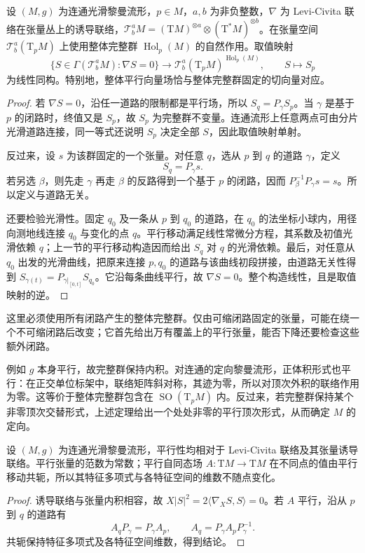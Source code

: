 \begin{theorem}\label{g3:thm:holonomy-parallel-tensors}
	设 \((M,g)\) 为连通光滑黎曼流形，\(p\in M\)，\(a,b\) 为非负整数，\(\nabla\) 为 Levi-Civita 联络在张量丛上的诱导联络，\(\mathcal T^a_bM=(\mathrm TM)^{\otimes a}\otimes(\mathrm T^*M)^{\otimes b}\)。在张量空间 \(\mathcal T^a_b(\mathrm{T}_pM)\) 上使用整体完整群 \(\operatorname{Hol}_p(M)\) 的自然作用。取值映射
	\[
		\{S\in\Gamma(\mathcal T^a_bM):\nabla S=0\}
		\longrightarrow
		\mathcal T^a_b(\mathrm{T}_pM)^{\operatorname{Hol}_p(M)},
		\qquad S\longmapsto S_p
	\]
	为线性同构。特别地，整体平行向量场恰与整体完整群固定的切向量对应。
\end{theorem}
\begin{proof}
	若 \(\nabla S=0\)，沿任一道路的限制都是平行场，所以
	\(S_q=P_\gamma S_p\)。当 \(\gamma\) 是基于 \(p\) 的闭路时，终值又是 \(S_p\)，故 \(S_p\) 为完整群不变量。连通流形上任意两点可由分片光滑道路连接，同一等式还说明 \(S_p\) 决定全部 \(S\)，因此取值映射单射。

	反过来，设 \(s\) 为该群固定的一个张量。对任意 \(q\)，选从 \(p\) 到 \(q\) 的道路 \(\gamma\)，定义
	\[
		S_q=P_\gamma s.
	\]
	若另选 \(\beta\)，则先走 \(\gamma\) 再走 \(\beta\) 的反路得到一个基于 \(p\) 的闭路，因而
	\(P_\beta^{-1}P_\gamma s=s\)。所以定义与道路无关。

	还要检验光滑性。固定 \(q_0\) 及一条从 \(p\) 到 \(q_0\) 的道路，在 \(q_0\) 的法坐标小球内，用径向测地线连接 \(q_0\) 与变化的点 \(q\)。平行移动满足线性常微分方程，其系数及初值光滑依赖 \(q\)；上一节的平行移动构造因而给出 \(S_q\) 对 \(q\) 的光滑依赖。最后，对任意从 \(q_0\) 出发的光滑曲线，把原来连接 \(p,q_0\) 的道路与该曲线初段拼接，由道路无关性得到
	\(S_{\gamma(t)}=P_{\gamma|_{[0,t]}}S_{q_0}\)。它沿每条曲线平行，故 \(\nabla S=0\)。整个构造线性，且是取值映射的逆。
\end{proof}

这里必须使用所有闭路产生的整体完整群。仅由可缩闭路固定的张量，可能在绕一个不可缩闭路后改变；它首先给出万有覆盖上的平行张量，能否下降还要检查这些额外闭路。

\ProseParagraphBreak

例如 \(g\) 本身平行，故完整群保持内积。对连通的定向黎曼流形，正体积形式也平行：在正交单位标架中，联络矩阵斜对称，其迹为零，所以对顶次外积的联络作用为零。这等价于整体完整群包含在 \(\operatorname{SO}(\mathrm{T}_pM)\) 内。反过来，若完整群保持某个非零顶次交替形式，上述定理给出一个处处非零的平行顶次形式，从而确定 \(M\) 的定向。

\begin{proposition}\label{g3:prop:parallel-tensor-constant-data}
	设 \((M,g)\) 为连通光滑黎曼流形，平行性均相对于 Levi-Civita 联络及其张量诱导联络。平行张量的范数为常数；平行自同态场 \(A:\mathrm{T}M\to\mathrm{T}M\) 在不同点的值由平行移动共轭，所以其特征多项式与各特征空间的维数不随点变化。
\end{proposition}
\begin{proof}
	诱导联络与张量内积相容，故
	\(X|S|^2=2\langle\nabla_XS,S\rangle=0\)。若 \(A\) 平行，沿从 \(p\) 到 \(q\) 的道路有
	\[
		A_qP_\gamma=P_\gamma A_p,
		\qquad A_q=P_\gamma A_pP_\gamma^{-1}.
	\]
	共轭保持特征多项式及各特征空间维数，得到结论。
\end{proof}

